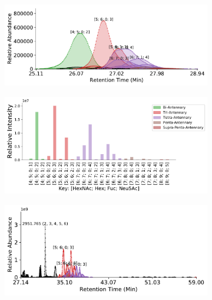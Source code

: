    \begin{figure}[tb]
        \centering
        \begin{minipage}{1\linewidth}
            \centering
            \begin{subfigure}[b]{0.49\linewidth}
                \includegraphics[width=1\linewidth, valign=t]{figure/native_agp_chromatograms.pdf}
                \subcaption{
                    \label{fig:agp_assignment:a}
                }
            \end{subfigure}
            \vspace{0pt}
            \begin{subfigure}[b]{0.49\linewidth}
                \includegraphics[width=1\linewidth, valign=b]{figure/native_agp_abundances.pdf}
                \subcaption{
                    \label{fig:agp_assignment:b}
                }
            \end{subfigure}
        \end{minipage}
        \begin{minipage}{1\linewidth}
            \centering
            \begin{subfigure}[b]{0.49\linewidth}
                \includegraphics[width=1\linewidth, valign=t]{figure/dp_agp_chromatograms.pdf}

\end{subfigure}
\end{minipage}
\end{figure}

